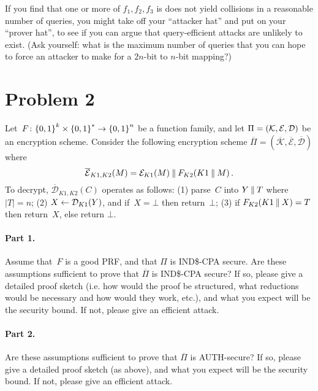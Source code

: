 \documentclass[11pt]{article}
\begin{document}
If you find that one or more of $f_1,f_2,f_3$ is does not yield
collisions in a reasonable number of queries, you might take off your
``attacker hat'' and put on your ``prover hat'', to see if you can
argue that query-efficient attacks are unlikely to exist.  (Ask
yourself: what is the maximum number of queries that you can hope to
force an attacker to make for a $2n$-bit to $n$-bit mapping?)

\newcommand{\oPi}{\overline{\Pi}}
\newcommand{\ocalK}{\overline{\mathcal{K}}}
\newcommand{\ocalE}{\overline{\mathcal{E}}}
\newcommand{\ocalD}{\overline{\mathcal{D}}}

\vspace*{-.25in}
\section*{Problem 2} Let~$F \colon {\{0,1\}}^k \times {\{0,1\}}^* \to {\{0,1\}}^n$
be a function family, and let $\Pi = ({\cal K},{\cal E},{\cal D})$ be an
encryption scheme.  Consider the following encryption scheme $\oPi =
(\ocalK,\ocalE,\ocalD)$ where 
\[
\ocalE_{K1,K2}(M) = \calE_{K1}(M)\concat F_{K2}(K1 \concat M)\, .
\]  
To decrypt, $\ocalD_{K1,K2}(C)$
operates as follows: (1) parse~$C$ into $Y \:\|\: T$ where $|T|=n$; (2) $X
\gets {\cal D}_{K1}(Y)$, and if~$X = \bot$ then return~$\bot$; (3) if
$F_{K2}(K1 \:\|\: X)=T$ then return~$X$, else return $\bot$.

\paragraph{Part 1.} Assume that~$F$ is a good PRF, and that $\Pi$ is IND\$-CPA secure.
Are these assumptions sufficient to prove that $\oPi$ is IND\$-CPA
secure?  If so, please give a detailed proof sketch (i.e. how would
the proof be structured, what reductions would be necessary and how
would they work, etc.), and what you expect will be the security
bound.  If not, please give an efficient attack.

\paragraph{Part 2.} Are these assumptions sufficient to prove that $\oPi$ is AUTH-secure?
If so, please give a detailed proof sketch (as above), and what you
expect will be the security bound.  If not, please give an efficient attack.
\end{document}
